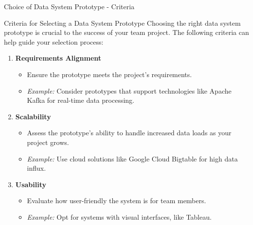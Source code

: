 \documentclass[aspectratio=169]{beamer}
\begin{document}
\begin{frame}[fragile]{Choice of Data System Prototype - Criteria}
  \begin{block}{Criteria for Selecting a Data System Prototype}
    Choosing the right data system prototype is crucial to the success of your team project. The following criteria can help guide your selection process:
  \end{block}
  \begin{enumerate}
    \item \textbf{Requirements Alignment}
    \begin{itemize}
      \item Ensure the prototype meets the project's requirements. 
      \item \textit{Example:} Consider prototypes that support technologies like Apache Kafka for real-time data processing.
    \end{itemize}

    \item \textbf{Scalability}
    \begin{itemize}
      \item Assess the prototype's ability to handle increased data loads as your project grows.
      \item \textit{Example:} Use cloud solutions like Google Cloud Bigtable for high data influx.
    \end{itemize}
    
    \item \textbf{Usability}
    \begin{itemize}
      \item Evaluate how user-friendly the system is for team members.
      \item \textit{Example:} Opt for systems with visual interfaces, like Tableau.
    \end{itemize}
  \end{enumerate}
\end{frame}
\end{document}
